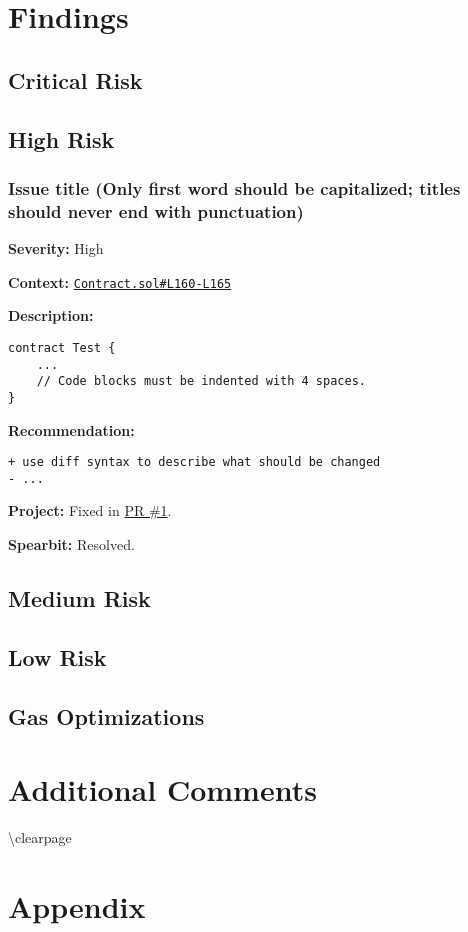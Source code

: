\documentclass[14pt]{extarticle}
\begin{document}
\section{Findings}\label{findings}

\subsection{Critical Risk}\label{critical-risk}

\subsection{High Risk}\label{high-risk}

\subsubsection{Issue title (Only first word should be capitalized;
titles should never end with
punctuation)}\label{issue-title-only-first-word-should-be-capitalized-titles-should-never-end-with-punctuation}

\textbf{Severity:} High

\textbf{Context:}
\href{https://github.com/actuallink}{\texttt{Contract.sol\#L160-L165}}

\textbf{Description:}

\begin{verbatim}
contract Test {
    ...
    // Code blocks must be indented with 4 spaces.
}
\end{verbatim}

\textbf{Recommendation:}

\begin{verbatim}
+ use diff syntax to describe what should be changed
- ...
\end{verbatim}

\textbf{Project:} Fixed in \href{Https://github.com/actuallink}{PR \#1}.

\textbf{Spearbit:} Resolved.

\subsection{Medium Risk}\label{medium-risk}

\subsection{Low Risk}\label{low-risk}

\subsection{Gas Optimizations}\label{gas-optimizations}

\section{Additional Comments}\label{additional-comments}

\textbackslash clearpage

\section{Appendix}\label{appendix}
\end{document}
